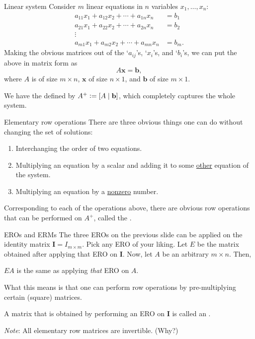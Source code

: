 \documentclass[dvipsnames]{beamer}
\theoremstyle{definition}
\begin{document}
\begin{frame}{Linear system}
    Consider $m$ linear equations in $n$ variables $x_{1}, \ldots, x_{n}$: \pause
    \begin{align*} 
        a_{11} x_{1} + a_{12} x_{2} + \cdots + a_{1n} x_{n} &= b_{1} \\
        a_{21} x_{1} + a_{22} x_{2} + \cdots + a_{2n} x_{n} &= b_{2} \\
        \vdots & \\
        a_{m1} x_{1} + a_{m2} x_{2} + \cdots + a_{mn} x_{n} &= b_{m}.
    \end{align*} \pause
    Making the obvious matrices out of the `$a_{ij}$'s, `$x_{i}$'s, and `$b_{i}$'s, we can put the above in matrix form as
    \begin{equation*} 
        A \mathbf{x} = \mathbf{b},
    \end{equation*} \pause
    where $A$ is of size $m \times n$, $\mathbf{x}$ of size $n \times 1$, and $\mathbf{b}$ of size $m \times 1$. \pause

    We have the  defined by \pause $A^{+} \vcentcolon= [A \mid \mathbf{b}]$, which completely captures the whole system.
\end{frame}
\begin{frame}{Elementary row operations}
    There are three obvious things one can do without changing the set of solutions:
    \begin{enumerate}[<+->]
        \item Interchanging the order of two equations.
        \item Multiplying an equation by a scalar and adding it to some \underline{other} equation of the system.
        \item Multiplying an equation by a \underline{nonzero} number.
    \end{enumerate} \pause
    Corresponding to each of the operations above, there are obvious row operations that can be performed on $A^{+}$, \pause called the .
\end{frame}
\begin{frame}{EROs and ERMs}
    The three EROs on the previous slide can be applied on the identity matrix $\mathbf{I} = I_{m \times m}$. \pause \newline 
    Pick any ERO of your liking. \pause Let $E$ be the matrix obtained after applying that ERO on $\mathbf{I}$. \newline
    Now, let $A$ be an arbitrary $m \times n$. \pause Then,
    \begin{center}
        $EA$ is the same as applying \emph{that} ERO on $A$. \pause
    \end{center}
    What this means is that one can perform row operations by pre-multiplying  certain (square) matrices. \pause

    A matrix that is obtained by performing an ERO on $\mathbf{I}$ is called an . \pause

    \emph{Note}: All elementary row matrices are invertible. \pause \hfill (Why?)
\end{frame}
\end{document}

